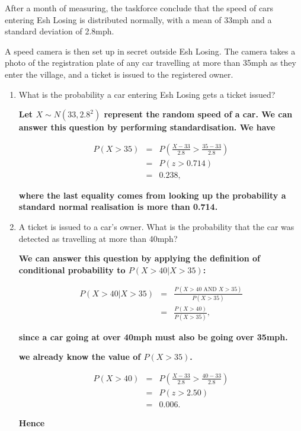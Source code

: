 \documentclass[11pt,a4paper]{article}
\begin{document}
\begin{enumerate}
After a month of measuring, the taskforce conclude that the speed of cars entering Esh Losing is distributed normally, with a mean of 33mph and a standard deviation of 2.8mph.

A speed camera is then set up in secret outside Esh Losing. The camera takes a photo of the registration plate of any car travelling at more than 35mph as they enter the village, and a ticket is issued to the registered owner.

\begin{enumerate}
\item What is the probability a car entering Esh Losing gets a ticket issued?

\textbf{Let $X\sim N(33,2.8^2)$ represent the random speed of a car. We can answer this question by performing standardisation. We have}

\textbf{
\begin{eqnarray*}
P(X>35)&=&P\left(\frac{X-33}{2.8}>\frac{35-33}{2.8}\right)
\\&=&P\left(z>0.714\right)\\
&=&0.238,
\end{eqnarray*}
}

\textbf{where the last equality comes from looking up the probability a standard normal realisation is more than 0.714.}

\item A ticket is issued to a car's owner. What is the probability that the car was detected as travelling at more than 40mph?

\textbf{We can answer this question by applying the definition of conditional probability to  $P(X>40|X>35)$:}

\textbf{
\begin{eqnarray*}
P(X>40|X>35)&=&\frac{P(X>40 \textrm{ AND } X>35)}{P(X>35)}\\
&=&\frac{P(X>40)}{P(X>35)},
\end{eqnarray*}
}

\textbf{since a car going at over 40mph must also be going over 35mph.}

\textbf{we already know the value of $P(X>35)$. }


\textbf{
\begin{eqnarray*}
P(X>40)&=&P\left(\frac{X-33}{2.8}>\frac{40-33}{2.8}\right)
\\&=&P\left(z>2.50\right)\\
&=&0.006.
\end{eqnarray*}
}

\textbf{Hence}


\end{enumerate}
\end{enumerate}
\end{document}

